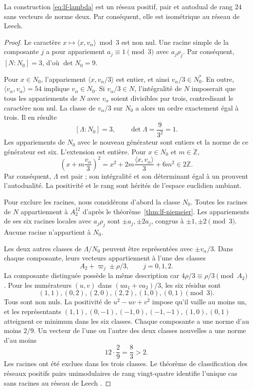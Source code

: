 \begin{theorem}
\label{thm:lf-leech}
La construction \eqref{eq:lf-lambda} est un
réseau positif, pair et autodual de rang \(24\)
sans vecteurs de norme deux. Par conséquent, elle est
isométrique au réseau de Leech.
\end{theorem}
\begin{proof}
Le caractère \(x\mapsto\langle x,v_\alpha\rangle\bmod3\)
est non nul. Une racine simple de la composante \(j\)
a pour appariement \(a_j\equiv1\pmod3\) avec
\(a_j\rho_j\). Par conséquent, \([N:N_0]=3\), d’où
\(\det N_0=9\).

Pour \(x\in N_0\), l’appariement
\(\langle x,v_\alpha/3\rangle\) est entier, et ainsi
\(v_\alpha/3\in N_0^*\). En outre,
\(\langle v_\alpha,v_\alpha\rangle=54\) implique
\(v_\alpha\in N_0\). Si \(v_\alpha/3\in N\),
l’intégralité de \(N\) imposerait que tous les
appariements de \(N\) avec \(v_\alpha\) soient
divisibles par trois, contredisant le caractère
non nul. La classe de \(v_\alpha/3\) sur \(N_0\)
a alors un ordre exactement égal à trois. Il en résulte
\[
 [\Lambda:N_0]=3,\qquad
 \det\Lambda=\frac9{3^2}=1.
\]
Les appariements de \(N_0\) avec le nouveau
générateur sont entiers et la norme de ce générateur
est six. L’extension est entière. Pour
\(x\in N_0\) et \(m\in\mathbb Z\),
\[
 \left(x+m\frac{v_\alpha}{3}\right)^2
 =x^2+2m\frac{\langle x,v_\alpha\rangle}{3}
       +6m^2\in2\mathbb Z.
\]
Par conséquent, \(\Lambda\) est pair ; son intégralité et son déterminant égal à un prouvent l'autodualité. La positivité et le rang sont hérités de l'espace euclidien ambiant.

Pour exclure les racines, nous considérons d'abord la classe \(N_0\). Toutes les racines de \(N\) appartiennent à \(A_2^{12}\) d'après le théorème~\ref{thm:lf-niemeier}. Les appariements de ses six racines locales avec \(a_j\rho_j\) sont \(\pm a_j,\pm2a_j\), congrus à \(\pm1,\pm2\pmod3\). Aucune racine n'appartient à \(N_0\).

Les deux autres classes de \(\Lambda/N_0\) peuvent
être représentées avec \(\pm v_\alpha/3\).
Dans chaque composante, leurs vecteurs appartiennent à
l’une des classes
\[
 A_2+\varpi_j\pm\rho/3,\qquad j=0,1,2.
\]
La composante distinguée possède la même
description car \(4\rho/3\equiv\rho/3\pmod{A_2}\).
Pour les numérateurs \((u,v)\) dans
\((ua_1+va_2)/3\), les six résidus sont
\[
 (1,1),(0,2),(2,0),(2,2),(1,0),(0,1)\pmod3.
\]
Tous sont non nuls. La positivité de
\(u^2-uv+v^2\) impose qu’il vaille au moins un,
et les représentants
\((1,1),(0,-1),(-1,0),(-1,-1),(1,0),(0,1)\)
atteignent ce minimum dans les six classes.
Chaque composante a une norme d’au moins \(2/9\).
Un vecteur de l’une ou l’autre des deux classes
nouvelles a une norme d’au moins
\[
 12\cdot\frac29=\frac83>2.
\]
Les racines ont été exclues dans les trois classes. Le théorème de classification des réseaux positifs pairs unimodulaires de rang vingt-quatre identifie l'unique cas sans racines au réseau de Leech \cite{ConwaySloane}.
\end{proof}

